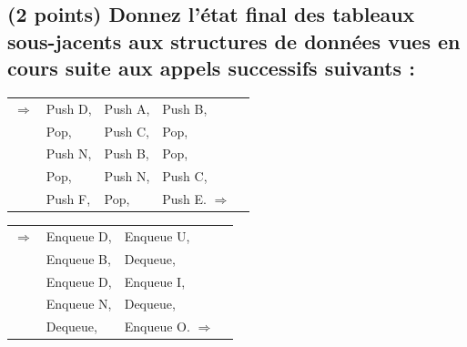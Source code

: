 \documentclass[11pt,a4paper]{article}
\begin{document}
\bigskip
\bigskip


\subsection{(2 points) Donnez l'état final des tableaux sous-jacents aux structures de données vues en cours suite aux appels successifs suivants : }


\begin{center}
\begin{table}[ht!]
  \centering
  \begin{minipage}{0.45\textwidth}


\begin{center}
\begin{tabular}{c L{2cm} L{2cm} L{2cm} c }
$\Rightarrow$ & Push D, & Push A, & Push B,  & \phantom{Iq} \\
& Pop,    & Push C, & Pop,     & \phantom{Iq} \\
& Push N, & Push B, & Pop,     & \phantom{Iq} \\
& Pop,    & Push N, & Push C,  & \phantom{Iq} \\
& Push F, & Pop,    & Push E. $\Rightarrow$ & \phantom{Iq} \\
\end{tabular}
\end{center}

  \end{minipage}
  \hfillx
  \begin{minipage}{0.01\textwidth}


  \end{minipage}
  \hfillx
  \begin{minipage}{0.45\textwidth}


\begin{center}
\begin{tabular}{c L{2.5cm} L{2.5cm} c }
$\Rightarrow$
& Enqueue D, & Enqueue U,  & \phantom{Iq} \\
& Enqueue B, & Dequeue,    & \phantom{Iq} \\
& Enqueue D, & Enqueue I,  & \phantom{Iq} \\
& Enqueue N, & Dequeue,    & \phantom{Iq} \\
& Dequeue,   & Enqueue O. $\Rightarrow$ & \phantom{Iq} \\
\end{tabular}
\end{center}

  \end{minipage}
\end{table}
\end{center}
\end{document}
